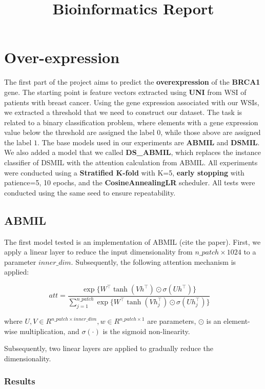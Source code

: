 \documentclass{article}
\title{Bioinformatics Report}
\begin{document}
\maketitle

\section{Over-expression} %
The first part of the project aims to predict the \textbf{overexpression} of the \textbf{BRCA1} gene. The starting point is feature vectors extracted using \textbf{UNI} from WSI of patients with breast cancer. Using the gene expression associated with our WSIs, we extracted a threshold that we need to construct our dataset. The task is related to a binary classification problem, where elements with a gene expression value below the threshold are assigned the label $0$, while those above are assigned the label $1$. The base models used in our experiments are \textbf{ABMIL} and \textbf{DSMIL}. We also added a model that we called \textbf{DS\_ABMIL}, which replaces the instance classifier of DSMIL with the attention calculation from ABMIL.
All experiments were conducted using a \textbf{Stratified K-fold} with K=5, \textbf{early stopping} with patience=5, 10 epochs, and the \textbf{CosineAnnealingLR} scheduler. All tests were conducted using the same seed to ensure repeatability.

\subsection{ABMIL}
The first model tested is an implementation of ABMIL (cite the paper). First, we apply a linear layer to reduce the input dimensionality from $n\_patch \times 1024$ to a parameter $inner\_dim$. Subsequently, the following attention mechanism is applied:

\begin{equation}
	att = \frac{\exp\{W^\top \tanh(V h^\top) \odot \sigma(U h^\top)\}}{\sum_{j=1}^{n\_patch} \exp\{W^\top \tanh(V h_j^\top) \odot \sigma(U h_j^\top)\}} \quad
\end{equation}

where $U, V \in R^{ n\_patch \times inner\_dim}, w \in R^{n\_patch \times 1}$ are parameters, $\odot$ is an element-wise multiplication, and $\sigma(\cdot)$ is the sigmoid non-linearity.

Subsequently, two linear layers are applied to gradually reduce the dimensionality.
\clearpage
\subsubsection{Results}
\end{document}
